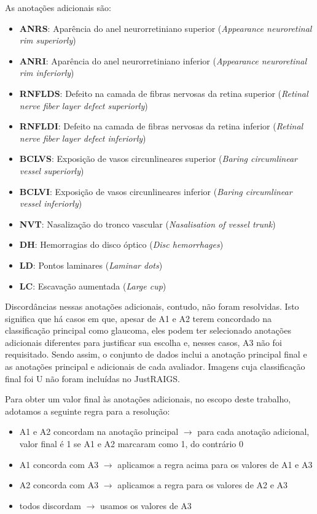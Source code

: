 \documentclass[12pt]{article}
\begin{document}
As anotações adicionais são:
\begin{itemize}
    \item \textbf{ANRS}: Aparência do anel neurorretiniano superior (\emph{Appearance neuroretinal rim superiorly})
    \item \textbf{ANRI}: Aparência do anel neurorretiniano inferior (\emph{Appearance neuroretinal rim inferiorly})
    \item \textbf{RNFLDS}: Defeito na camada de fibras nervosas da retina superior (\emph{Retinal nerve fiber layer defect superiorly})
    \item \textbf{RNFLDI}: Defeito na camada de fibras nervosas da retina inferior (\emph{Retinal nerve fiber layer defect inferiorly})
    \item \textbf{BCLVS}: Exposição de vasos circunlineares superior (\emph{Baring circumlinear vessel superiorly})
    \item \textbf{BCLVI}: Exposição de vasos circunlineares inferior (\emph{Baring circumlinear vessel inferiorly})
    \item \textbf{NVT}: Nasalização do tronco vascular (\emph{Nasalisation of vessel trunk})
    \item \textbf{DH}: Hemorragias do disco óptico (\emph{Disc hemorrhages})
    \item \textbf{LD}: Pontos laminares (\emph{Laminar dots})
    \item \textbf{LC}: Escavação aumentada (\emph{Large cup})
\end{itemize}

Discordâncias nessas anotações adicionais, contudo, não foram resolvidas. Isto significa que há casos em que, apesar de A1 e A2 terem concordado na classificação principal como glaucoma, eles podem ter selecionado anotações adicionais diferentes para justificar sua escolha e, nesses casos, A3 não foi requisitado. Sendo assim, o conjunto de dados inclui a anotação principal final e as anotações principal e adicionais de cada avaliador. Imagens cuja classificação final foi U não foram incluídas no JustRAIGS.

Para obter um valor final às anotações adicionais, no escopo deste trabalho, adotamos a seguinte regra para a resolução:

\begin{itemize}
    \item A1 e A2 concordam na anotação principal $\rightarrow$ para cada anotação adicional, valor final é 1 se A1 e A2 marcaram como 1, do contrário 0
    \item A1 concorda com A3 $\rightarrow$ aplicamos a regra acima para os valores de A1 e A3
    \item A2 concorda com A3 $\rightarrow$ aplicamos a regra para os valores de A2 e A3
    \item todos discordam $\rightarrow$ usamos os valores de A3
\end{itemize}
\end{document}
